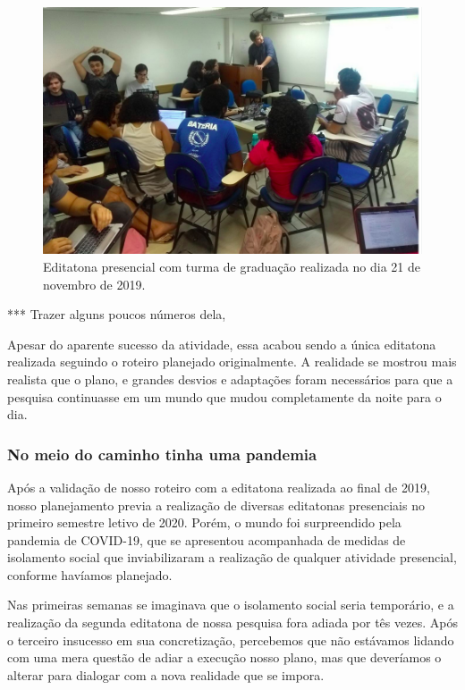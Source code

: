 \begin{figure}[H]
    \centering
    \includegraphics[width=1\textwidth]{Images/editatona_presencial.png}
    \caption{Editatona presencial com turma de graduação realizada no dia 21 de novembro de 2019.}
    \label{fig:editatona_presencial}
\end{figure}

***  Trazer alguns poucos números dela, 

Apesar do aparente sucesso da atividade, essa acabou sendo a única editatona realizada seguindo o roteiro planejado originalmente. A realidade se mostrou mais realista que o plano, e grandes desvios e adaptações foram necessários para que a pesquisa continuasse em um mundo que mudou completamente da noite para o dia.

\subsubsection{No meio do caminho tinha uma pandemia}

Após a validação de nosso roteiro com a editatona realizada ao final de 2019, nosso planejamento previa a realização de diversas editatonas presenciais no primeiro semestre letivo de 2020. Porém, o mundo foi surpreendido pela pandemia de COVID-19, que se apresentou acompanhada de medidas de isolamento social que inviabilizaram a realização de qualquer atividade presencial, conforme havíamos planejado.

Nas primeiras semanas se imaginava que o isolamento social seria temporário, e a realização da segunda editatona de nossa pesquisa fora adiada por tês vezes. Após o terceiro insucesso em sua concretização, percebemos que não estávamos lidando com uma mera questão de adiar a execução nosso plano, mas que deveríamos o alterar para dialogar com a nova realidade que se impora.

